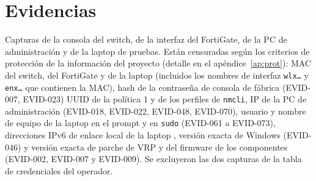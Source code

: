 \documentclass[11pt,a4paper]{article}
\begin{document}
\section{Evidencias}\label{ap:evid}
Capturas de la consola del switch, de la interfaz del FortiGate, de la PC de administración y de la laptop de pruebas. Están censuradas según los criterios de protección de la información del proyecto (detalle en el apéndice~\ref{ap:prot}): MAC del switch, del FortiGate y de la laptop (incluidos los nombres de interfaz \texttt{wlx\ldots} y \texttt{enx\ldots} que contienen la MAC), hash de la contraseña de consola de fábrica (EVID-007, EVID-023) UUID de la política 1 y de los perfiles de \texttt{nmcli}, IP de la PC de administración (EVID-018, EVID-022, EVID-048, EVID-070), usuario y nombre de equipo de la laptop en el prompt y en \texttt{sudo} (EVID-061 a EVID-073), direcciones IPv6 de enlace local de la laptop , versión exacta de Windows (EVID-046) y versión exacta de parche de VRP y del firmware de los componentes (EVID-002, EVID-007 y EVID-009). Se excluyeron las dos capturas de la tabla de credenciales del operador.
\end{document}

